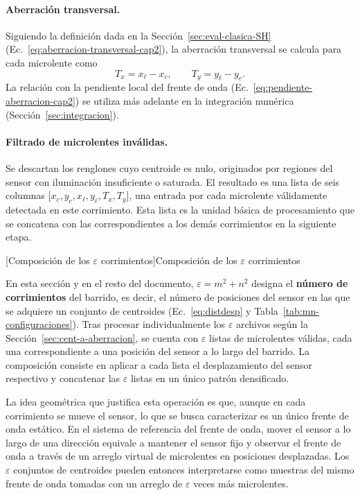 \documentclass[letterpaper,12pt,oneside]{book}
\makeatletter
\renewcommand\subsection{\@startsection{subsection}{2}{\z@}{-3.25ex\@plus -1ex \@minus -.2ex}{1.5ex \@plus .2ex}{\normalfont\large\bfseries\raggedright}}
\makeatother
\begin{document}
\paragraph{Aberración transversal.} Siguiendo la definición dada en la Sección~\ref{sec:eval-clasica-SH} (Ec.~\ref{eq:aberracion-transversal-cap2}), la aberración transversal se calcula para cada microlente como
\begin{equation}
T_x = x_\ell - x_c, \qquad T_y = y_\ell - y_c.
\label{eq:aberracion-transversal}
\end{equation}
La relación con la pendiente local del frente de onda (Ec.~\ref{eq:pendiente-aberracion-cap2}) se utiliza más adelante en la integración numérica (Sección~\ref{sec:integracion}).

\paragraph{Filtrado de microlentes inválidas.} Se descartan los renglones cuyo centroide
es nulo, originados por regiones del sensor con iluminación insuficiente o saturada. El
resultado es una lista de seis columnas $\bigl[x_c, y_c, x_\ell, y_\ell, T_x, T_y\bigr]$,
una entrada por cada microlente válidamente detectada en este corrimiento. Esta lista es
la unidad básica de procesamiento que se concatena con las correspondientes a los demás
corrimientos en la siguiente etapa.

\subsection[Composición de los \texorpdfstring{$\varepsilon$}{epsilon} corrimientos]{Composición de los $\varepsilon$ corrimientos}\label{sec:composicion-corrimientos}

En esta sección y en el resto del documento, $\varepsilon = m^2 + n^2$ designa el
\textbf{número de corrimientos} del barrido, es decir, el número de posiciones del sensor
en las que se adquiere un conjunto de centroides (Ec.~\ref{eq:distdesp} y
Tabla~\ref{tab:mn-configuraciones}). Tras procesar individualmente los $\varepsilon$
archivos según la Sección~\ref{sec:cent-a-aberracion}, se cuenta con $\varepsilon$ listas
de microlentes válidas, cada una correspondiente a una posición del sensor a lo largo del
barrido. La composición consiste en aplicar a cada lista el desplazamiento del sensor
respectivo y concatenar las $\varepsilon$ listas en un único patrón densificado.

La idea geométrica que justifica esta operación es que, aunque en cada corrimiento se
mueve el sensor, lo que se busca caracterizar es un único frente de onda estático. En el
sistema de referencia del frente de onda, mover el sensor a lo largo de una dirección
equivale a mantener el sensor fijo y observar el frente de onda a través de un arreglo
virtual de microlentes en posiciones desplazadas. Los $\varepsilon$ conjuntos de
centroides pueden entonces interpretarse como muestras del mismo frente de onda tomadas
con un arreglo de $\varepsilon$ veces más microlentes.
\end{document}

